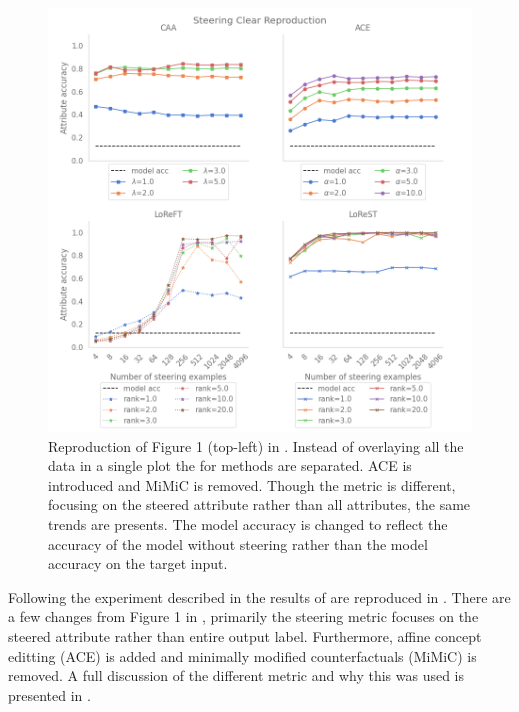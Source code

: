 \begin{figure}
    \centering
    \captionsetup{width=\textwidth}
    \includegraphics[width=\textwidth]{figures/steering_clear.png}
    \caption{
        Reproduction of Figure 1 (top-left) in \citet{steering-clear}.
        Instead of overlaying all the data in a single plot the for methods are separated.
        ACE \citep{ace} is introduced and MiMiC \citep{mimic} is removed.
        Though the metric is different, focusing on the steered attribute rather than all attributes, the same trends are presents.
        The model accuracy is changed to reflect the accuracy of the model without steering rather than the model accuracy on the target input.
    }
    \label{fig:steering-clear}
\end{figure}

Following the experiment described in  the results of \cite{steering-clear} are reproduced in .
There are a few changes from Figure 1 in \cite{steering-clear}, primarily the steering metric focuses on the steered attribute rather than entire output label.
Furthermore, affine concept editting (ACE) \citep{ace} is added and minimally modified counterfactuals (MiMiC) \citep{mimic} is removed.
A full discussion of the different metric and why this was used is presented in .

